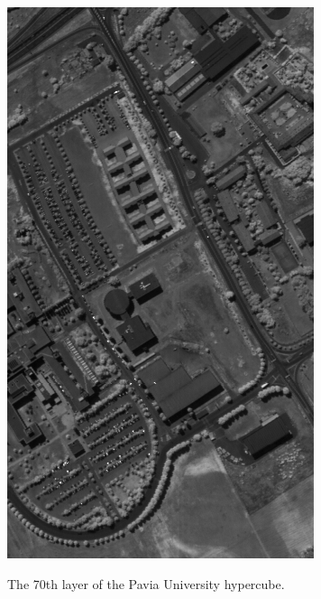 \begin{marginfigure}[.cm]
    \centering
    \includegraphics[width=\linewidth]{figs/hyper_point_cloud/pavia_dataset.png}
	\caption{The 70th layer of the Pavia University hypercube. }
	\label{fig:hyper_pavia_dataset}
\end{marginfigure}
